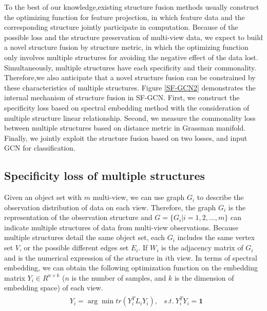 \documentclass[review]{elsarticle}
\begin{document}
To the best of our knowledge,existing structure fusion methods usually construct the optimizing function for feature projection, in which feature data and the corresponding structure jointly participate in computation. Because of the possible loss and the structure preservation of multi-view data, we expect to build a novel structure fusion by structure metric, in which the optimizing function only involves multiple structures for avoiding the negative effect of the data lost. Simultaneously, multiple structures have each specificity and their commonality. Therefore,we also anticipate that a novel structure fusion can be constrained by these characteristics of multiple structures. Figure \ref{SF-GCN2} demonstrates the internal mechanism of structure fusion in SF-GCN. First, we construct the specificity loss based on spectral embedding method with the consideration of multiple structure linear relationship. Second, we measure the commonality loss between multiple structures based on distance metric in Grassman manifold. Finally, we jointly exploit the structure fusion based on two losses, and input GCN for classification.

\subsection{Specificity loss of multiple structures}
Given an object set with $m$ multi-view, we can use graph $G_{i}$ to describe the observation distribution of data on each view. Therefore, the graph $G_{i}$ is the representation of the observation structure and $G=\{G_{i}|i=1,2,...,m\}$ can indicate multiple structures of data from multi-view observations. Because multiple structures detail the same object set, each $G_{i}$ includes the same vertex set $V$, or the possible different edges set $E_{i}$. If $W_{i}$ is the adjacency matrix of $G_{i}$ and is the numerical expression of the structure in $i$th view. In terms of spectral embedding, we can obtain the following optimization function on the embedding matrix $Y_{i}\in R^{n\times k}$ ($n$ is the number of samples, and $k$ is the dimension of embedding space) of each view.
\begin{align}
\label{loss1}
\begin{aligned}
&Y_{i}=\arg \min tr(Y_{i}^{T}L_{i}Y_{i}),
&s.t.\ Y_{i}^{T}Y_{i}=\mathbf{1}
 \end{aligned}
\end{align}
\end{document}

